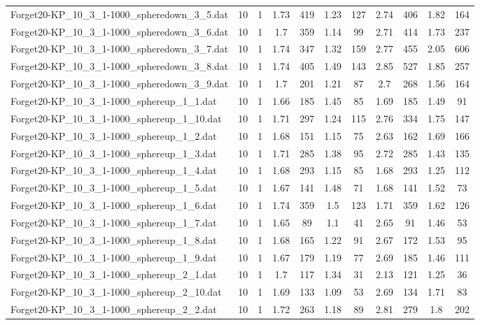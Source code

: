 \begin{table}[!ht]
\begin{tabular}{lcccccccccc}
Forget20-KP\_10\_3\_1-1000\_spheredown\_3\_5.dat & 10 & 1 & 1.73 & 419 & 1.23 & 127 & 2.74 & 406 & 1.82 & 164 \\
Forget20-KP\_10\_3\_1-1000\_spheredown\_3\_6.dat & 10 & 1 & 1.7 & 359 & 1.14 & 99 & 2.71 & 414 & 1.73 & 237 \\
Forget20-KP\_10\_3\_1-1000\_spheredown\_3\_7.dat & 10 & 1 & 1.74 & 347 & 1.32 & 159 & 2.77 & 455 & 2.05 & 606 \\
Forget20-KP\_10\_3\_1-1000\_spheredown\_3\_8.dat & 10 & 1 & 1.74 & 405 & 1.49 & 143 & 2.85 & 527 & 1.85 & 257 \\
Forget20-KP\_10\_3\_1-1000\_spheredown\_3\_9.dat & 10 & 1 & 1.7 & 201 & 1.21 & 87 & 2.7 & 268 & 1.56 & 164 \\
Forget20-KP\_10\_3\_1-1000\_sphereup\_1\_1.dat & 10 & 1 & 1.66 & 185 & 1.45 & 85 & 1.69 & 185 & 1.49 & 91 \\
Forget20-KP\_10\_3\_1-1000\_sphereup\_1\_10.dat & 10 & 1 & 1.71 & 297 & 1.24 & 115 & 2.76 & 334 & 1.75 & 147 \\
Forget20-KP\_10\_3\_1-1000\_sphereup\_1\_2.dat & 10 & 1 & 1.68 & 151 & 1.15 & 75 & 2.63 & 162 & 1.69 & 166 \\
Forget20-KP\_10\_3\_1-1000\_sphereup\_1\_3.dat & 10 & 1 & 1.71 & 285 & 1.38 & 95 & 2.72 & 285 & 1.43 & 135 \\
Forget20-KP\_10\_3\_1-1000\_sphereup\_1\_4.dat & 10 & 1 & 1.68 & 293 & 1.15 & 85 & 1.68 & 293 & 1.25 & 112 \\
Forget20-KP\_10\_3\_1-1000\_sphereup\_1\_5.dat & 10 & 1 & 1.67 & 141 & 1.48 & 71 & 1.68 & 141 & 1.52 & 73 \\
Forget20-KP\_10\_3\_1-1000\_sphereup\_1\_6.dat & 10 & 1 & 1.74 & 359 & 1.5 & 123 & 1.71 & 359 & 1.62 & 126 \\
Forget20-KP\_10\_3\_1-1000\_sphereup\_1\_7.dat & 10 & 1 & 1.65 & 89 & 1.1 & 41 & 2.65 & 91 & 1.46 & 53 \\
Forget20-KP\_10\_3\_1-1000\_sphereup\_1\_8.dat & 10 & 1 & 1.68 & 165 & 1.22 & 91 & 2.67 & 172 & 1.53 & 95 \\
Forget20-KP\_10\_3\_1-1000\_sphereup\_1\_9.dat & 10 & 1 & 1.67 & 179 & 1.19 & 77 & 2.69 & 185 & 1.46 & 111 \\
Forget20-KP\_10\_3\_1-1000\_sphereup\_2\_1.dat & 10 & 1 & 1.7 & 117 & 1.34 & 31 & 2.13 & 121 & 1.25 & 36 \\
Forget20-KP\_10\_3\_1-1000\_sphereup\_2\_10.dat & 10 & 1 & 1.69 & 133 & 1.09 & 53 & 2.69 & 134 & 1.71 & 83 \\
Forget20-KP\_10\_3\_1-1000\_sphereup\_2\_2.dat & 10 & 1 & 1.72 & 263 & 1.18 & 89 & 2.81 & 279 & 1.8 & 202 \\

\end{tabular}
\end{table}
